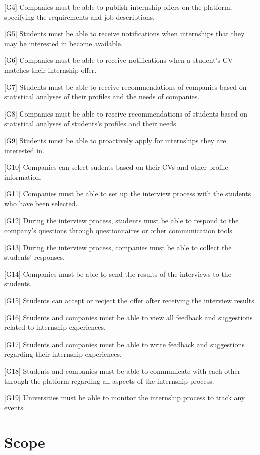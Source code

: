 [G4] Companies must be able to publish internship offers on the platform, specifying the requirements and job descriptions.

[G5] Students must be able to receive notifications when internships that they may be interested in become available.

[G6] Companies must be able to receive notifications when a student's CV matches their internship offer.

[G7] Students must be able to receive recommendations of companies based on statistical analyses of their profiles and the needs of companies.

[G8] Companies must be able to receive recommendations of students based on statistical analyses of students's profiles and their needs.

[G9] Students must be able to proactively apply for internships they are interested in.

[G10] Companies can select sudents based on their CVs and other profile information.

[G11] Companies must be able to set up the interview process with the students who have been selected.

[G12] During the interview process, students must be able to respond to the company's questions through questionnaires or other communication tools.

[G13] During the interview process, companies must be able to collect the students' responses.

[G14] Companies must be able to send the results of the interviews to the students.

[G15] Students can accept or recject the offer after receiving the interview results.

[G16] Students and companies must be able to view all feedback and suggestions related to internship experiences.

[G17] Students and companies must be able to write feedback and suggestions regarding their internship experiences.

[G18] Students and companies must be able to communicate with each other through the platform regarding all aspects of the internship process.

[G19] Universities must be able to monitor the internship process to track any events. 


\newpage
\section{Scope}
\label{sec:scope}
